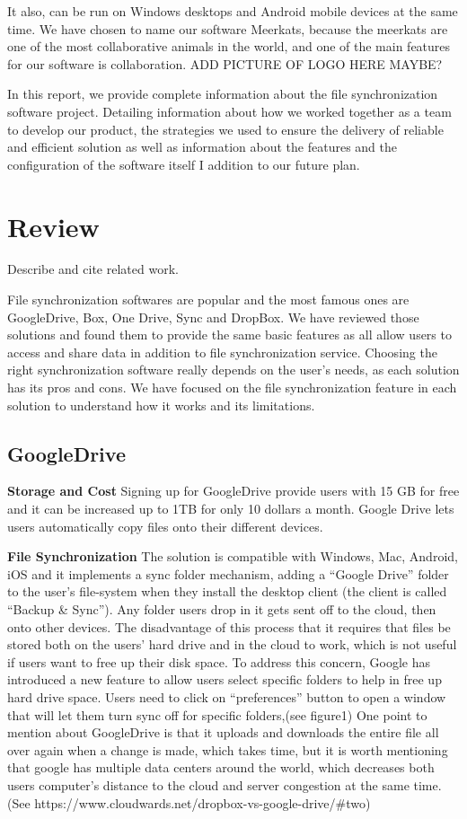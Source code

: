 \documentclass{article}
\begin{document}
It also, can be run on Windows desktops and Android mobile devices at the same time. We have chosen to name our software Meerkats, because the meerkats are one of the most collaborative animals in the world, and one of the main features for our software is collaboration. ADD PICTURE OF LOGO HERE MAYBE?

In this report, we provide complete information about the file synchronization software project. Detailing information about how we worked together as a team to develop our product, the strategies we used to ensure the delivery of reliable and efficient solution as well as information about the features and the configuration of the software itself I addition to our future plan.


\section{Review}
Describe and cite related work.

File synchronization softwares are popular and the most famous ones are GoogleDrive, Box, One Drive, Sync and DropBox. We have reviewed those solutions and found them to provide the same basic features as all allow users to access and share data in addition to file synchronization service. Choosing the right synchronization software really depends on the user’s needs, as each solution has its pros and cons. We have focused on the file synchronization feature in each solution to understand how it works and its limitations.

\subsection{GoogleDrive}

\textbf{Storage and Cost}
Signing up for GoogleDrive provide users with 15 GB for free and it can be increased up to 1TB for only 10 dollars a month. Google Drive lets users automatically copy files onto their different devices.

\newline
\hfill \break
\textbf{File Synchronization}
The solution is compatible with Windows, Mac, Android, iOS and it implements a sync folder mechanism, adding a “Google Drive” folder to the user’s file-system when they install the desktop client (the client is called “Backup & Sync”). Any folder users drop in it gets sent off to the cloud, then onto other devices. The disadvantage of this process that it requires that files be stored both on the users’ hard drive and in the cloud to work, which is not useful if users want to free up their disk space. To address this concern, Google has introduced a new feature to allow users select specific folders to help in free up hard drive space. Users need to click on “preferences” button to open a window that will let them turn sync off for specific folders,(see figure1)
One point to mention about GoogleDrive is that it uploads and downloads the entire file all over again when a change is made, which takes time, but it is worth mentioning that google has multiple data centers around the world, which decreases both users computer’s distance to the cloud and server congestion at the same time. (See https://www.cloudwards.net/dropbox-vs-google-drive/#two)
\end{document}
